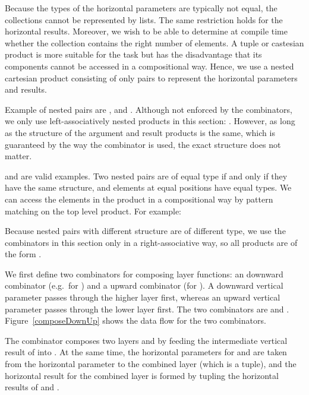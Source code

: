 \documentclass[preprint,natbib]{sigplanconf}
\begin{document}
Because the types of the horizontal parameters are typically not equal, the collections cannot be represented by lists. The same restriction holds for the horizontal results. Moreover, we wish to be able to determine at compile time whether the collection contains the right number of elements. A tuple or castesian product is more suitable for the task but has the disadvantage that its components cannot be accessed in a compositional way. Hence, we use a nested cartesian product consisting of only pairs to represent the horizontal parameters and results.

Example of nested pairs are , and . Although not enforced by the combinators, we only use left-associatively nested products in this section: 
. However, as long as the structure of the argument and result products is the same, which is guaranteed by the way the  combinator is used, the exact structure does not matter.


\bc and  are valid examples.\ec
 \bc Two nested pairs are of equal type if and only if they have the same structure, and elements at equal positions have equal types. We can access the elements in the product in a compositional way by pattern matching on the top level product. For example:  \ec

\bc Because nested pairs with different structure are of different type, we use the combinators in this section only in a right-associative way, so all products are of the form . 
\ec

We first define two combinators for composing layer functions: an downward combinator (e.g.\ for ) and a upward combinator (for ). A downward vertical parameter passes through the higher layer first, whereas an upward vertical parameter passes through the lower layer first. The two combinators are  and . Figure~\ref{composeDownUp} shows the data flow for the two combinators. 

The combinator  composes two layers  and  by feeding the intermediate vertical result of  into . At the same time, the horizontal parameters for  and  are taken from the horizontal parameter to the combined layer (which is a tuple), and the horizontal result for the combined layer is formed by tupling the horizontal results of  and . 
\end{document}
